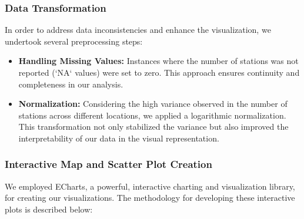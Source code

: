 \subsubsection{Data Transformation}
In order to address data inconsistencies and enhance the visualization, we undertook several preprocessing steps:\\

\begin{itemize}
    \item \textbf{Handling Missing Values:} Instances where the number of stations was not reported (`NA` values) were set to zero. This approach ensures continuity and completeness in our analysis.
    \item \textbf{Normalization:} Considering the high variance observed in the number of stations across different locations, we applied a logarithmic normalization. This transformation not only stabilized the variance but also improved the interpretability of our data in the visual representation.
\end{itemize}

\subsubsection{Interactive Map and Scatter Plot Creation}
We employed ECharts, a powerful, interactive charting and visualization library, for creating our visualizations. The methodology for developing these interactive plots is described below:

